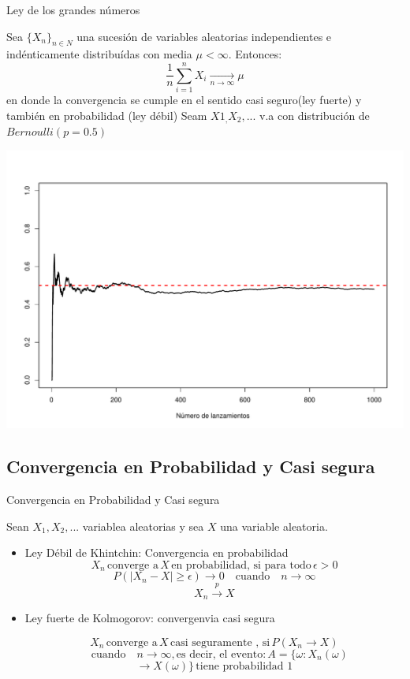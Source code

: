 \documentclass[
  ignorenonframetext,
]{beamer}
\begin{document}
\begin{frame}{Ley de los grandes números}

\justifying Sea \(\{X_n\}_{n\in N}\) una sucesión de variables
aleatorias independientes e indénticamente distribuídas con media
\(\mu < \infty\). Entonces:
\[\displaystyle \frac{1}{n} \sum_{i=1}^{n}X_i  \xrightarrow[n\rightarrow{}\infty]\,{\mu}\]
en donde la convergencia se cumple en el sentido casi seguro(ley fuerte)
y también en probabilidad (ley débil) Seam \(X1_,X_2,...\) v.a con
distribución de \(Bernoulli(p=0.5)\)

\begin{center}\includegraphics[width=0.5\linewidth]{clase2Inferencia_files/figure-beamer/unnamed-chunk-9-1} \end{center}

\end{frame}

\hypertarget{convergencia-en-probabilidad-y-casi-segura}{%
\subsection{Convergencia en Probabilidad y Casi
segura}\label{convergencia-en-probabilidad-y-casi-segura}}

\begin{frame}{Convergencia en Probabilidad y Casi segura}

\justifying Sean \(X_1,X_2,...\) variablea aleatorias y sea \(X\) una
variable aleatoria.

\begin{itemize}
  \item Ley Débil de Khintchin: Convergencia en probabilidad
      $$X_n \,\text{converge a}\, X \,\text{en probabilidad, si para todo}\, \epsilon>0 $$
      $$P(|X_n -X|\geq \epsilon)\longrightarrow 0 \quad\text{cuando}\quad n\to\infty $$
      $$\displaystyle X_n  \overset{p}\longrightarrow X$$
  \item Ley fuerte de Kolmogorov: convergenvia casi segura 
  
       $$X_n \,\text{converge a}\, X \,\text{casi seguramente , si}\,P(X_n \longrightarrow X)$$   
       $$\quad\text{cuando}\quad n\to\infty,\text{es decir, el evento:}\, A=\{\omega:X_n(\omega)$$ $$\longrightarrow X(\omega)\}\, \text{tiene probabilidad 1} $$
\end{itemize}

\end{frame}
\end{document}
